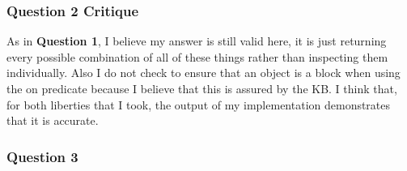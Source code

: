 \documentclass[11pt]{article}
\begin{document}
    \hypertarget{question-2-critique}{%
\subsubsection{Question 2 Critique}\label{question-2-critique}}

As in \textbf{Question 1}, I believe my answer is still valid here, it
is just returning every possible combination of all of these things
rather than inspecting them individually. Also I do not check to ensure
that an object is a block when using the on predicate because I believe
that this is assured by the KB. I think that, for both liberties that I
took, the output of my implementation demonstrates that it is accurate.

    \hypertarget{question-3}{%
\subsubsection{Question 3}\label{question-3}}
\end{document}
